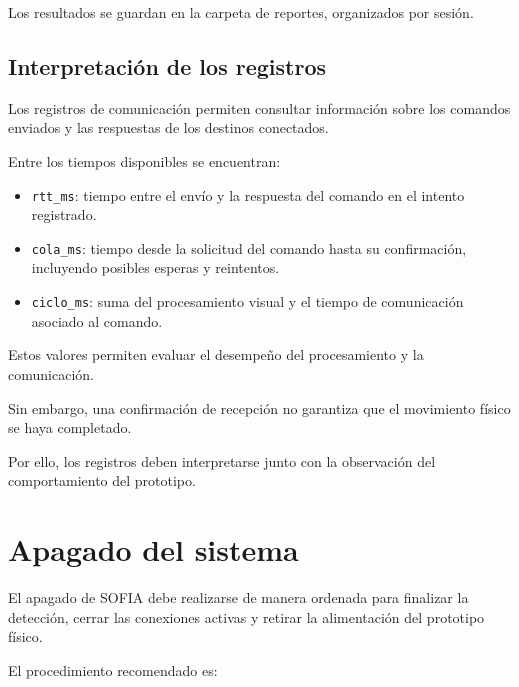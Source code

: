 \documentclass[letterpaper,journal]{IEEEtran}
\begin{document}
Los resultados se guardan en
la carpeta de reportes,
organizados por sesión.

\subsection{Interpretación de los registros}

Los registros de comunicación
permiten consultar información
sobre los comandos enviados
y las respuestas de los
destinos conectados.

Entre los tiempos disponibles
se encuentran:

\begin{itemize}
    \item \texttt{rtt\_ms}:
    tiempo entre el envío
    y la respuesta del comando
    en el intento registrado.

    \item \texttt{cola\_ms}:
    tiempo desde la solicitud
    del comando hasta su
    confirmación, incluyendo
    posibles esperas y reintentos.

    \item \texttt{ciclo\_ms}:
    suma del procesamiento visual
    y el tiempo de comunicación
    asociado al comando.
\end{itemize}

Estos valores permiten evaluar
el desempeño del procesamiento
y la comunicación.

Sin embargo, una confirmación
de recepción no garantiza
que el movimiento físico
se haya completado.

Por ello, los registros deben
interpretarse junto con la
observación del comportamiento
del prototipo.

\section{Apagado del sistema}
\label{sec:apagado}

El apagado de SOFIA debe realizarse
de manera ordenada para finalizar
la detección, cerrar las conexiones
activas y retirar la alimentación
del prototipo físico.

El procedimiento recomendado es:
\end{document}

